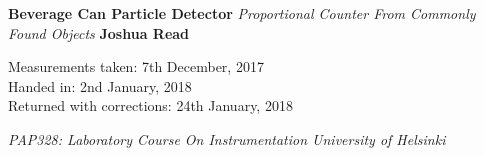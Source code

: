 \documentclass[a4paper, twoside, 11pt]{report}
\begin{document}




\thispagestyle{empty}

\hspace{0pt}
\vfill

\begin{center}
\Huge\textbf{Beverage Can Particle Detector}
\vskip2mm
\LARGE\textit{Proportional Counter From Commonly Found Objects}
\vskip5mm
\LARGE\textbf{Joshua Read}
\normalsize
\end{center}

\vfill
\hspace{0pt}

\vfill
\begin{flushleft}
Measurements taken: \hspace{6.28mm} 7th December, 2017 \\
Handed in: \hspace{26.1mm} 2nd January, 2018 \\
Returned with corrections: 24th January, 2018\\
\vskip5mm
\end{flushleft}	
\begin{center}
\large\textit{PAP328: Laboratory Course On Instrumentation \hspace{19mm} University of Helsinki}
\end{center}
	

\end{document}
